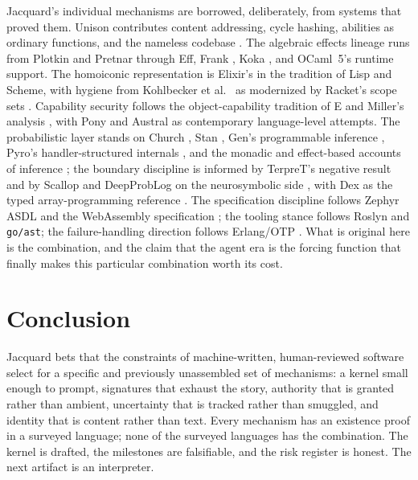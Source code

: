 \documentclass[11pt]{article}
\newcommand{\jacquard}{Jacquard}
\begin{document}
\jacquard's individual mechanisms are borrowed, deliberately, from systems that proved them. Unison contributes content addressing, cycle hashing, abilities as ordinary functions, and the nameless codebase \cite{unison}. The algebraic effects lineage runs from Plotkin and Pretnar \cite{plotkin2009} through Eff, Frank \cite{lindley2017}, Koka \cite{leijen2017}, and OCaml~5's runtime support. The homoiconic representation is Elixir's \cite{elixir} in the tradition of Lisp and Scheme, with hygiene from Kohlbecker et al.\ \cite{kohlbecker1986} as modernized by Racket's scope sets \cite{flatt2016}. Capability security follows the object-capability tradition of E and Miller's analysis \cite{miller2006}, with Pony \cite{clebsch2015} and Austral \cite{austral} as contemporary language-level attempts. The probabilistic layer stands on Church \cite{goodman2008}, Stan \cite{carpenter2017}, Gen's programmable inference \cite{cusumano2019}, Pyro's handler-structured internals \cite{bingham2019}, and the monadic and effect-based accounts of inference \cite{scibior2015}; the boundary discipline is informed by TerpreT's negative result \cite{gaunt2016} and by Scallop and DeepProbLog on the neurosymbolic side \cite{li2023, manhaeve2018}, with Dex as the typed array-programming reference \cite{paszke2021}. The specification discipline follows Zephyr ASDL \cite{asdl} and the WebAssembly specification \cite{wasm}; the tooling stance follows Roslyn and \texttt{go/ast}; the failure-handling direction follows Erlang/OTP \cite{armstrong2003}. What is original here is the combination, and the claim that the agent era is the forcing function that finally makes this particular combination worth its cost.

\section{Conclusion}

\jacquard{} bets that the constraints of machine-written, human-reviewed software select for a specific and previously unassembled set of mechanisms: a kernel small enough to prompt, signatures that exhaust the story, authority that is granted rather than ambient, uncertainty that is tracked rather than smuggled, and identity that is content rather than text. Every mechanism has an existence proof in a surveyed language; none of the surveyed languages has the combination. The kernel is drafted, the milestones are falsifiable, and the risk register is honest. The next artifact is an interpreter.
\end{document}
